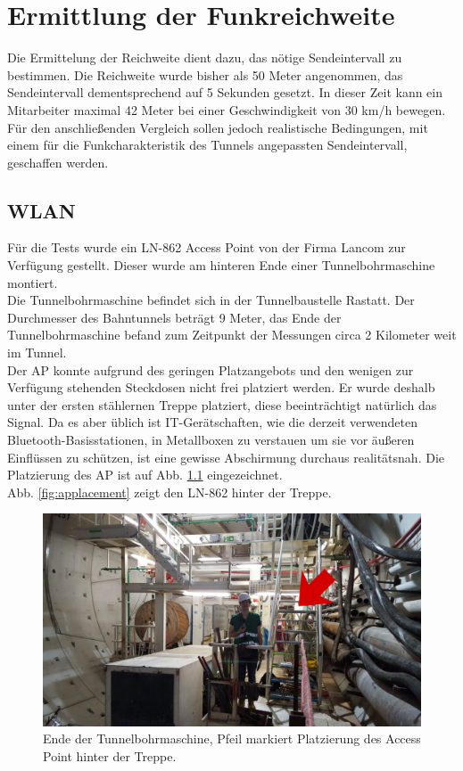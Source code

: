 \chapter{Ermittlung der Funkreichweite}
\label{ch:Reichweite}
Die Ermittelung der Reichweite dient dazu, das nötige Sendeintervall zu bestimmen.
Die Reichweite wurde bisher als 50 Meter angenommen, das Sendeintervall dementsprechend auf 5 Sekunden gesetzt.
In dieser Zeit kann ein Mitarbeiter maximal 42 Meter bei einer Geschwindigkeit von 30 km/h bewegen. 
Für den anschließenden Vergleich sollen jedoch realistische Bedingungen, mit einem für die Funkcharakteristik des Tunnels angepassten Sendeintervall, geschaffen werden.

\section{WLAN}
Für die Tests wurde ein LN-862 Access Point von der Firma Lancom zur Verfügung gestellt.
Dieser wurde am hinteren Ende einer Tunnelbohrmaschine montiert.\\
Die Tunnelbohrmaschine befindet sich in der Tunnelbaustelle Rastatt. 
Der Durchmesser des Bahntunnels beträgt 9 Meter, das Ende der Tunnelbohrmaschine befand zum Zeitpunkt der Messungen circa 2 Kilometer weit im Tunnel.\\
Der AP konnte aufgrund des geringen Platzangebots und den wenigen zur Verfügung stehenden Steckdosen nicht frei platziert werden.
Er wurde deshalb unter der ersten stählernen Treppe platziert, diese beeinträchtigt natürlich das Signal.
Da es aber üblich ist IT-Gerätschaften, wie die derzeit verwendeten Bluetooth-Basisstationen, in Metallboxen zu verstauen um sie vor äußeren Einflüssen zu schützen, ist eine gewisse Abschirmung durchaus realitätsnah.
Die Platzierung des AP ist auf Abb. \ref{fig:tunnelmark} eingezeichnet.\\
Abb. \ref{fig:applacement} zeigt den LN-862 hinter der Treppe.

\begin{figure}[h]
  \centering
	\includegraphics[width=\textwidth]{images/tunnelmark.png}
  \caption{Ende der Tunnelbohrmaschine, Pfeil markiert Platzierung des Access Point hinter der Treppe.}
  \label{fig:tunnelmark}
\end{figure}

